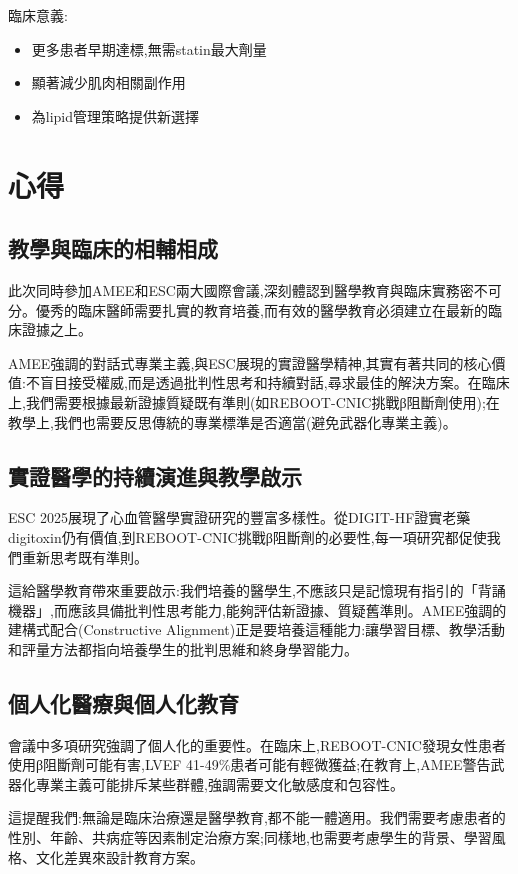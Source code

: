 \documentclass[12pt,a4paper]{article}
\begin{document}
臨床意義:
\begin{itemize}[nosep]
    \item 更多患者早期達標,無需statin最大劑量
    \item 顯著減少肌肉相關副作用
    \item 為lipid管理策略提供新選擇
\end{itemize}

\section{心得}

\subsection{教學與臨床的相輔相成}

此次同時參加AMEE和ESC兩大國際會議,深刻體認到醫學教育與臨床實務密不可分。優秀的臨床醫師需要扎實的教育培養,而有效的醫學教育必須建立在最新的臨床證據之上。

AMEE強調的對話式專業主義,與ESC展現的實證醫學精神,其實有著共同的核心價值:不盲目接受權威,而是透過批判性思考和持續對話,尋求最佳的解決方案。在臨床上,我們需要根據最新證據質疑既有準則(如REBOOT-CNIC挑戰β阻斷劑使用);在教學上,我們也需要反思傳統的專業標準是否適當(避免武器化專業主義)。

\subsection{實證醫學的持續演進與教學啟示}

ESC 2025展現了心血管醫學實證研究的豐富多樣性。從DIGIT-HF證實老藥digitoxin仍有價值,到REBOOT-CNIC挑戰β阻斷劑的必要性,每一項研究都促使我們重新思考既有準則。

這給醫學教育帶來重要啟示:我們培養的醫學生,不應該只是記憶現有指引的「背誦機器」,而應該具備批判性思考能力,能夠評估新證據、質疑舊準則。AMEE強調的建構式配合(Constructive Alignment)正是要培養這種能力:讓學習目標、教學活動和評量方法都指向培養學生的批判思維和終身學習能力。

\subsection{個人化醫療與個人化教育}

會議中多項研究強調了個人化的重要性。在臨床上,REBOOT-CNIC發現女性患者使用β阻斷劑可能有害,LVEF 41-49\%患者可能有輕微獲益;在教育上,AMEE警告武器化專業主義可能排斥某些群體,強調需要文化敏感度和包容性。

這提醒我們:無論是臨床治療還是醫學教育,都不能一體適用。我們需要考慮患者的性別、年齡、共病症等因素制定治療方案;同樣地,也需要考慮學生的背景、學習風格、文化差異來設計教育方案。
\end{document}
